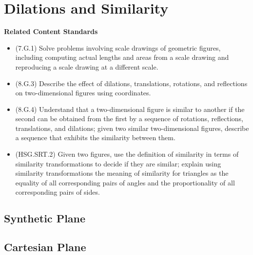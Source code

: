 \documentclass[
]{book}
\providecommand{\tightlist}{%
  \setlength{\itemsep}{0pt}\setlength{\parskip}{0pt}}
\newenvironment{standards}{}{}
\let\stdsection\section
\renewcommand\section{\newpage\stdsection}
\theoremstyle{definition}
\theoremstyle{definition}
\theoremstyle{definition}
\theoremstyle{definition}
\theoremstyle{remark}
\begin{document}
\hypertarget{dilations-and-similarity}{%
\section{Dilations and Similarity}\label{dilations-and-similarity}}

\begin{standards}

\begin{center}
\textbf{Related Content Standards}

\end{center}

\begin{itemize}
\tightlist
\item
  (7.G.1) Solve problems involving scale drawings of geometric figures, including computing actual lengths and areas from a scale drawing and reproducing a scale drawing at a different scale.
\item
  (8.G.3) Describe the effect of dilations, translations, rotations, and reflections on two-dimensional figures using coordinates.
\item
  (8.G.4) Understand that a two-dimensional figure is similar to another if the second can be obtained from the first by a sequence of rotations, reflections, translations, and dilations; given two similar two-dimensional figures, describe a sequence that exhibits the similarity between them.
\item
  (HSG.SRT.2) Given two figures, use the definition of similarity in terms of similarity transformations to decide if they are similar; explain using similarity transformations the meaning of similarity for triangles as the equality of all corresponding pairs of angles and the proportionality of all corresponding pairs of sides.
\end{itemize}

\end{standards}

\hypertarget{synthetic-plane-5}{%
\subsection{Synthetic Plane}\label{synthetic-plane-5}}

\hypertarget{cartesian-plane-1}{%
\subsection{Cartesian Plane}\label{cartesian-plane-1}}
\end{document}
